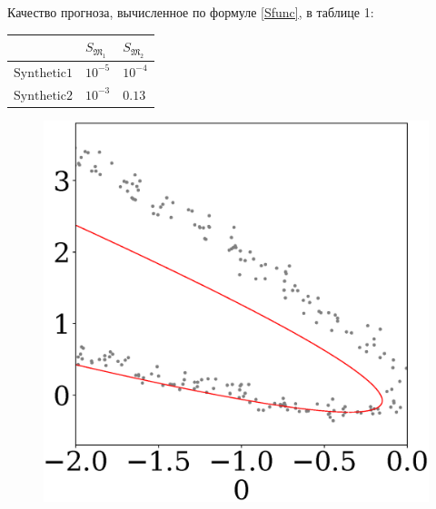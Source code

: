 \documentclass[12pt,twoside]{article}
\begin{document}
Качество прогноза, вычисленное по формуле \ref{Sfunc}, в таблице 1:
\begin{table}[h!]
\centering
\begin{tabular}{|l|l|l|}
\hline
                     & $S_{\mathfrak{M}_1}$   & $S_{\mathfrak{M}_2}$  \\ \hline
$\text{Synthetic} 1$ & $10^{-5}$  & $10^{-4}$ \\ \hline
$\text{Synthetic} 2$ & $10^{-3}$ & $0.13$ \\ \hline
\end{tabular}
\end{table}

\begin{figure}
\begin{minipage}{.25\textwidth}
      \includegraphics[scale = 0.19]{511_0.eps}
\end{minipage}
\begin{minipage}{.25\textwidth}


\end{minipage}
\end{figure}
\end{document}
